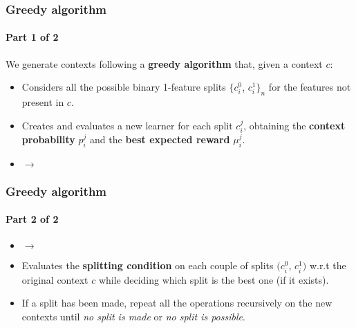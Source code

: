 
\begin{frame}

\frametitle{Greedy algorithm}
\framesubtitle{Part 1 of 2}

We generate contexts following a \textbf{greedy algorithm} that, given a context $c$:

\begin{itemize}[label={*}]
    \item Considers all the possible binary 1-feature splits $\{c_i^0$, $c_i^1\}_n$ for the features not present in $c$.
    \item Creates and evaluates a new learner for each split $c_i^j$, obtaining the \textbf{context probability} $p_i^j$ and the \textbf{best expected reward} $\mu_i^j$.
    \item $\rightarrow$
\end{itemize}

\end{frame}


\begin{frame}

\frametitle{Greedy algorithm}
\framesubtitle{Part 2 of 2}

\begin{itemize}[label={*}]
    \item $\rightarrow$
    \item Evaluates the \textbf{splitting condition} on each couple of splits $(c_i^0$, $c_i^1)$ w.r.t the original context $c$ while deciding which split is the best one (if it exists).
    \item If a split has been made, repeat all the operations recursively on the new contexts until \textit{no split is made} or \textit{no split is possible}.
\end{itemize}

\end{frame}


